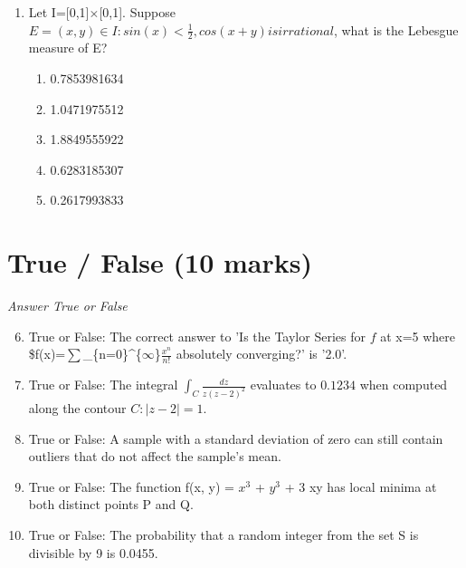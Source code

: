 \documentclass[12pt]{article}
\begin{document}
\begin{enumerate}[label=\arabic*.]
\begin{enumerate}[label=(\alph*)]
    \item 30 in. by 57 in.
\end{enumerate}
\item Let I=[0,1]\ensuremath{\times}[0,1]. Suppose $E={(x, y) \in I: sin(x)<\frac{1}{2}, cos(x+y) is irrational}$, what is the Lebesgue measure of E?
\begin{enumerate}[label=(\alph*)]
    \item 0.7853981634
    \item 1.0471975512
    \item 1.8849555922
    \item 0.6283185307
    \item 0.2617993833
\end{enumerate}
\end{enumerate}

\section*{True / False (10 marks)}
\textit{Answer True or False}
\begin{enumerate}[label=\arabic*.]
\setcounter{enumi}{5}
\item True or False: The correct answer to 'Is the Taylor Series for $f$ at x=5 where \$f(x)=\ensuremath{\sum}\_\{n=0\}^\{\ensuremath{\infty}\}\ensuremath{\frac{x^n}{n!}} absolutely converging?' is '2.0'.
\item True or False: The integral \( \int_C \frac{dz}{z(z-2)^2} \) evaluates to \(0.1234\) when computed along the contour \( C: |z - 2| = 1 \).
\item True or False: A sample with a standard deviation of zero can still contain outliers that do not affect the sample's mean.
\item True or False: The function f(x, y) = $x^3$ + $y^3$ + 3 xy has local minima at both distinct points P and Q.
\item True or False: The probability that a random integer from the set S is divisible by 9 is 0.0455.
\end{enumerate}
\end{document}
